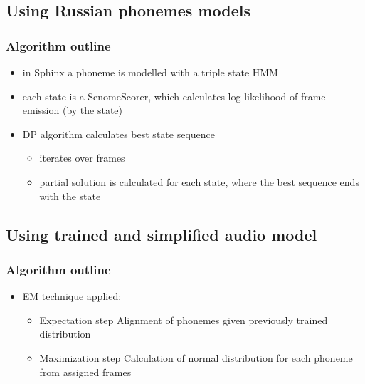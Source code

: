 \documentclass[]{beamer}
\begin{document}
\subsection{Using Russian phonemes models}
\begin{frame}
    \frametitle{Algorithm outline}
    \begin{itemize}
        \item in Sphinx a phoneme is modelled with a triple state HMM
        \item each state is a SenomeScorer, which calculates log likelihood of frame emission (by the state)
        \item DP algorithm calculates best state sequence
        \begin{itemize}
            \item iterates over frames
            \item partial solution is calculated for each state, where the best sequence ends with the state
        \end{itemize}
    \end{itemize}
\end{frame}
\subsection{Using trained and simplified audio model}
\begin{frame}
    \frametitle{Algorithm outline}
    \begin{itemize}
        \item EM technique applied:
        \begin{itemize}
            \item Expectation step \newline
            Alignment of phonemes given previously trained distribution
            \item Maximization step \newline
            Calculation of normal distribution for each phoneme from assigned frames
        \end{itemize}
    \end{itemize}
\end{frame}
\end{document}
